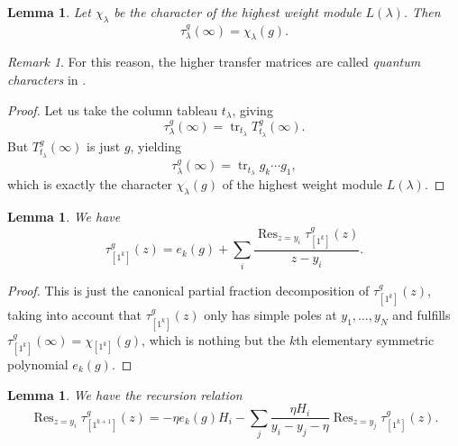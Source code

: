 \documentclass[11pt]{report}
\newtheorem{lemma}[theorem]{Lemma}
\theoremstyle{definition}
\theoremstyle{remark}
\newtheorem*{remark}{Remark}
\theoremstyle{remark}
\begin{document}
\begin{lemma}\label{lemma:transferMatrixExpansion}
Let $\chi_\lambda$ be the character of the highest weight module $L(\lambda)$. Then
\begin{equation*}
\tau_\lambda^g(\infty) = \chi_\lambda(g).
\end{equation*}
\end{lemma}

\begin{remark}
For this reason, the higher transfer matrices are called \emph{quantum characters} in \cite{book:arutyunov:betheAnsatz}.
\end{remark}

\begin{proof}
Let us take the column tableau $t_\lambda$, giving
\begin{equation*}
\tau_\lambda^g(\infty) = \operatorname{tr}_{t_\lambda} T_{t_\lambda}^g(\infty).
\end{equation*}
But $T_{t_\lambda}^g(\infty)$ is just $g$, yielding
\begin{equation*}
\tau_\lambda^g(\infty) = \operatorname{tr}_{t_\lambda} g_k \cdots g_1,
\end{equation*}
which is exactly the character $\chi_\lambda(g)$ of the highest weight module $L(\lambda)$.
\end{proof}

\begin{lemma}
We have
\begin{equation*}
\tau_{[1^k]}^g(z) = e_k(g) + \sum_i \frac{\operatorname{Res}_{z=y_i} \tau_{[1^k]}^g(z)}{z-y_i}.
\end{equation*}
\end{lemma}

\begin{proof}
This is just the canonical partial fraction decomposition of $\tau_{[1^k]}^g(z)$, taking into account that $\tau_{[1^k]}^g(z)$ only has simple poles at $y_1,...,y_N$ and fulfills $\tau_{[1^k]}^g(\infty) = \chi_{[1^k]}(g)$, which is nothing but the $k$th elementary symmetric polynomial $e_k(g)$.
\end{proof}

\begin{lemma}\label{lemma:recursionRelation}
We have the recursion relation
\begin{equation*}
\operatorname{Res}_{z=y_i} \tau_{[1^{k+1}]}^g(z)
= -\eta e_k(g) H_i - \sum_j \frac{\eta H_i}{y_i-y_j-\eta} \operatorname{Res}_{z=y_j} \tau_{[1^k]}^g(z).
\end{equation*}
\end{lemma}
\end{document}
